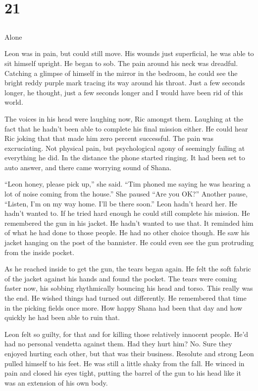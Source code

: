 \chapter{21}
\section{}
Alone  

Leon was in pain, but could still move.  His wounds just superficial, he was able to sit himself upright.  He began to sob.  The pain around his neck was dreadful.  Catching a glimpse of himself in the mirror in the bedroom, he could see the bright reddy purple mark tracing its way around his throat.  Just a few seconds longer, he thought, just a few seconds longer and I would have been rid of this world.  

The voices in his head were laughing now, Ric amongst them.  Laughing at the fact that he hadn't been able to complete his final mission either.  He could hear Ric joking that that made him zero percent successful.  The pain was excruciating.  Not physical pain, but psychological agony of seemingly failing at everything he did.  In the distance the phone started ringing.  It had been set to auto answer, and there came worrying sound of Shana.

``Leon honey, please pick up,'' she said.  ``Tim phoned me saying he was hearing a lot of noise coming from the house.''  She paused  ``Are you OK?''  Another pause, ``Listen, I'm on my way home.  I'll be there soon.''  Leon hadn't heard her.  He hadn't wanted to.  If he tried hard enough he could still complete his mission.  He remembered the gun in his jacket.  He hadn't wanted to use that.  It reminded him of what he had done to those people.  He had no other choice though.  He saw his jacket hanging on the post of the bannister.  He could even see the gun protruding from the inside pocket.

As he reached inside to get the gun, the tears began again.  He felt the soft fabric of the jacket against his hands and found the pocket.  The tears were coming faster now, his sobbing rhythmically bouncing his head and torso.  This really was the end.  He wished things had turned out differently.  He remembered that time in the picking fields once more.  How happy Shana had been that day and how quickly he had been able to ruin that.  

Leon felt so guilty, for that and for killing those relatively innocent people.  He'd had no personal vendetta against them.  Had they hurt him?  No.  Sure they enjoyed hurting each other, but that was their business.  Resolute and strong Leon pulled himself to his feet.  He was still a little shaky from the fall.  He winced in pain and closed his eyes tight, putting the barrel of the gun to his head like it was an extension of his own body.  

